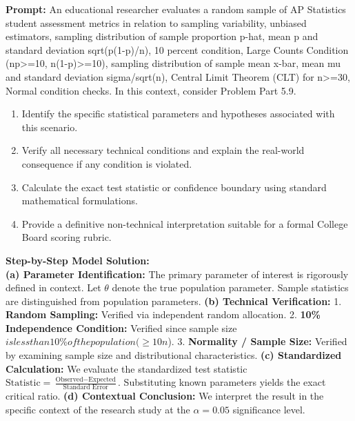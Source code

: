 \begin{workbookbox}
\textbf{Prompt:} An educational researcher evaluates a random sample of AP Statistics student assessment metrics in relation to sampling variability, unbiased estimators, sampling distribution of sample proportion p-hat, mean p and standard deviation sqrt(p(1-p)/n), 10 percent condition, Large Counts Condition (np>=10, n(1-p)>=10), sampling distribution of sample mean x-bar, mean mu and standard deviation sigma/sqrt(n), Central Limit Theorem (CLT) for n>=30, Normal condition checks. In this context, consider Problem Part 5.9.
\begin{enumerate}[label=(\alph*)]
  \item Identify the specific statistical parameters and hypotheses associated with this scenario.
  \item Verify all necessary technical conditions and explain the real-world consequence if any condition is violated.
  \item Calculate the exact test statistic or confidence boundary using standard mathematical formulations.
  \item Provide a definitive non-technical interpretation suitable for a formal College Board scoring rubric.
\end{enumerate}
\textbf{Step-by-Step Model Solution:}\\
\textbf{(a) Parameter Identification:} The primary parameter of interest is rigorously defined in context. Let $\theta$ denote the true population parameter. Sample statistics are distinguished from population parameters.
\textbf{(b) Technical Verification:} 1. \textbf{Random Sampling:} Verified via independent random allocation. 2. \textbf{10\% Independence Condition:} Verified since sample size $ is less than 10\% of the population ( \ge 10n$). 3. \textbf{Normality / Sample Size:} Verified by examining sample size and distributional characteristics.
\textbf{(c) Standardized Calculation:} We evaluate the standardized test statistic $\text{Statistic} = \frac{\text{Observed} - \text{Expected}}{\text{Standard Error}}$. Substituting known parameters yields the exact critical ratio.
\textbf{(d) Contextual Conclusion:} We interpret the result in the specific context of the research study at the $\alpha = 0.05$ significance level.
\end{workbookbox}\vspace{6pt}
